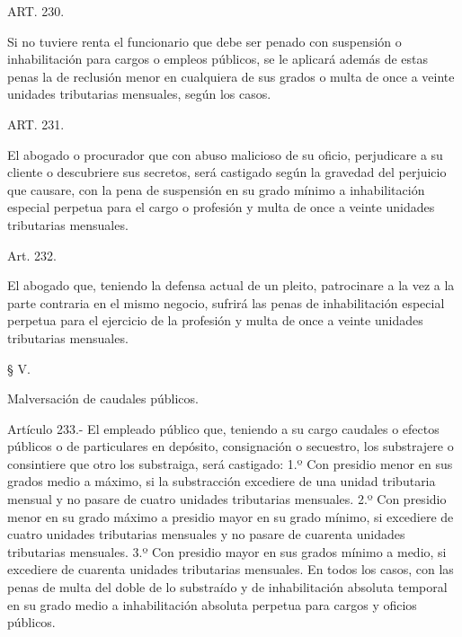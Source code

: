     ART. 230.

    Si no tuviere renta el funcionario que debe ser penado con suspensión o inhabilitación para cargos o empleos públicos, se le aplicará además de estas penas la de reclusión menor en cualquiera de sus grados o multa de once a veinte unidades tributarias mensuales, según los casos.









    ART. 231.

    El abogado o procurador que con abuso malicioso de su oficio, perjudicare a su cliente o descubriere sus secretos, será castigado según la gravedad del perjuicio que causare, con la pena de suspensión en su grado mínimo a inhabilitación especial perpetua para el cargo o profesión y multa de once a veinte unidades tributarias mensuales.








    Art. 232.

    El abogado que, teniendo la defensa actual de un pleito, patrocinare a la vez a la parte contraria en el mismo negocio, sufrirá las penas de inhabilitación especial perpetua para el ejercicio de la profesión y multa de once a veinte unidades tributarias mensuales.








    § V.

    Malversación de caudales públicos.



    Artículo 233.- El empleado público que, teniendo a su cargo caudales o efectos públicos o de particulares en depósito, consignación o secuestro, los substrajere o consintiere que otro los substraiga, será castigado:
    1.º Con presidio menor en sus grados medio a máximo, si la substracción excediere de una unidad tributaria mensual y no pasare de cuatro unidades tributarias mensuales.
    2.º Con presidio menor en su grado máximo a presidio mayor en su grado mínimo, si excediere de cuatro unidades tributarias mensuales y no pasare de cuarenta unidades tributarias mensuales.
    3.º Con presidio mayor en sus grados mínimo a medio, si excediere de cuarenta unidades tributarias mensuales.
    En todos los casos, con las penas de multa del doble de lo substraído y de inhabilitación absoluta temporal en su grado medio a inhabilitación absoluta perpetua para cargos y oficios públicos.





